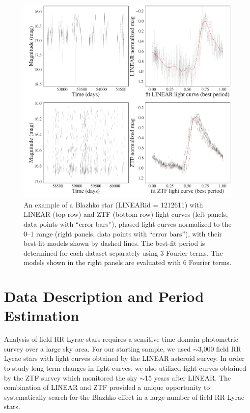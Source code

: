 
\phantom{There is some latex bug somewhere and this dummy call is needed to force it to make pdf...}



\begin{figure}[ht]
  \centering
  \includegraphics[width=18cm]{lc_pair.png}
  \vskip -0.2in
  \caption{An example of a Blazhko star (LINEARid = 1212611) with LINEAR (top row) and ZTF (bottom row) light
    curves (left panels, data points with ``error bars''), phased light curves normalized to the 0--1 range (right panels, data points
    with ``error bars''), with their best-fit models shown by dashed lines. The best-fit period is determined for each
    dataset separately using 3 Fourier terms. The models shown in the right panels are evaluated with 6 Fourier terms. }
 \label{fig:lc_pair}
\end{figure}


\section{Data Description and Period Estimation \label{sec:data}}

Analysis of field RR Lyrae stars requires a sensitive time-domain photometric survey over a large sky area.
For our starting sample, we used $\sim$3,000 field RR Lyrae stars with light curves obtained by the LINEAR
asteroid survey. In order to study long-term changes in light curves, we also utilized light curves obtained
by the ZTF survey which monitored the sky $\sim$15 years after LINEAR. The combination of LINEAR and
ZTF provided a unique opportunity to systematically search for the Blazhko effect in a large number of
field RR Lyrae stars.


